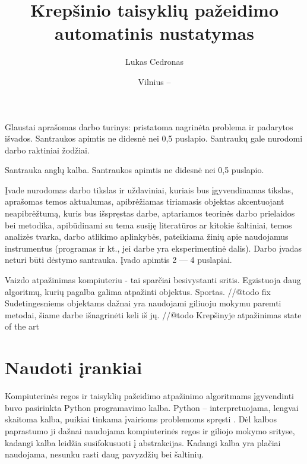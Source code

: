 \documentclass{VUMIFPSbakalaurinis}
\institute{Informatikos institutas}  %
\title{Krepšinio taisyklių pažeidimo automatinis nustatymas}
\author{Lukas Cedronas}
\date{Vilnius – \the\year}
\begin{document}
\maketitle


Glaustai aprašomas darbo turinys: pristatoma nagrinėta problema ir padarytos
išvados. Santraukos apimtis ne didesnė nei 0,5 puslapio. Santraukų gale
nurodomi darbo raktiniai žodžiai. 

Santrauka anglų kalba. Santraukos apimtis ne didesnė nei 0,5 puslapio.

\tableofcontents

Įvade nurodomas darbo tikslas ir uždaviniai, kuriais bus įgyvendinamas tikslas,
aprašomas temos aktualumas, apibrėžiamas tiriamasis objektas akcentuojant
neapibrėžtumą, kuris bus išspręstas darbe, aptariamos teorinės darbo prielaidos
bei metodika, apibūdinami su tema susiję literatūros ar kitokie šaltiniai,
temos analizės tvarka, darbo atlikimo aplinkybės, pateikiama žinių apie
naudojamus instrumentus (programas ir kt., jei darbe yra eksperimentinė dalis).
Darbo įvadas neturi būti dėstymo santrauka. Įvado apimtis 2 –– 4 puslapiai.


Vaizdo atpažinimas kompiuteriu - tai sparčiai besivystanti sritis. Egzistuoja daug algoritmų, kurių pagalba galima atpažinti objektus. Sportas. //@todo fix Sudetingesniems objektams dažnai yra naudojami giliuoju mokymu paremti metodai, šiame darbe išnagrinėti keli iš jų.  
//@todo Krepšinyje atpažinimas state of the art

\section{Naudoti įrankiai}

Kompiuterinės regos ir taisyklių pažeidimo atpažinimo algoritmams įgyvendinti buvo pasirinkta Python programavimo kalba. Python – interpretuojama, lengvai skaitoma kalba, puikiai tinkama įvairioms problemoms spręsti \cite{Python}. Dėl kalbos paprastumo ji dažnai naudojama kompiuterinės regos ir giliojo mokymo srityse, kadangi kalba leidžia susifokusuoti į abstrakcijas. Kadangi kalba yra plačiai naudojama, nesunku rasti daug pavyzdžių bei šaltinių. 
\end{document}
